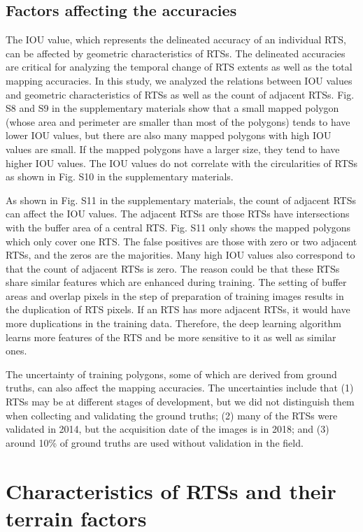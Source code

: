 \documentclass[preprint,12pt,authoryear]{elsarticle}
\begin{document}
\subsection{Factors affecting the accuracies}
\label{subsec_acc_factors}

The IOU value, which represents the delineated accuracy of an individual RTS, can be affected by geometric characteristics of RTSs.
The delineated accuracies are critical for analyzing the temporal change of RTS extents as well as the total mapping accuracies.
In this study, we analyzed the relations between IOU values and geometric characteristics of RTSs as well as the count of adjacent RTSs.
Fig. S8 and S9 in the supplementary materials show that a small mapped polygon (whose area and perimeter are smaller than most of the polygons) tends to have lower IOU values, but there are also many mapped polygons with high IOU values are small. 
If the mapped polygons have a larger size, they tend to have higher IOU values.
The IOU values do not correlate with the circularities of RTSs as shown in Fig. S10 in the supplementary materials. 


As shown in Fig. S11 in the supplementary materials, the count of adjacent RTSs can affect the IOU values. The adjacent RTSs are those RTSs have intersections with the buffer area of a central RTS. Fig. S11 only shows the mapped polygons which only cover one RTS. The false positives are those with zero or two adjacent RTSs, and the zeros are the majorities. Many high IOU values also correspond to that the count of adjacent RTSs is zero. The reason could be that these RTSs share similar features which are enhanced during training. The setting of buffer areas and overlap pixels in the step of preparation of training images results in the duplication of RTS pixels. If an RTS has more adjacent RTSs, it would have more duplications in the training data. Therefore, the deep learning algorithm learns more features of the RTS and be more sensitive to it as well as similar ones. 

The uncertainty of training polygons, some of which are derived from ground truths, can also affect the mapping accuracies. The uncertainties include that (1) RTSs may be at different stages of development, but we did not distinguish them when collecting and validating the ground truths; (2) many of the RTSs were validated in 2014, but the acquisition date of the images is in 2018; and (3) around 10\% of ground truths are used without validation in the field. 


\section{Characteristics of RTSs and their terrain factors}
\label{sec_spatial_terrain}
\end{document}
